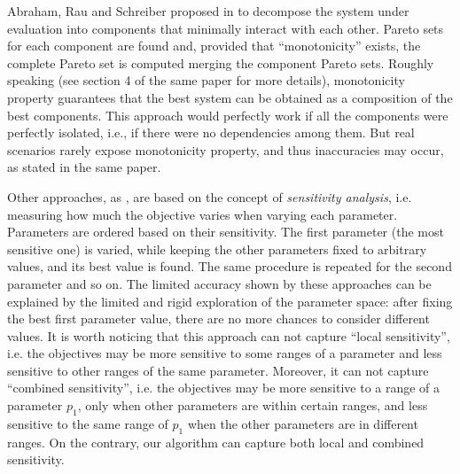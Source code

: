 Abraham, Rau and Schreiber proposed in \cite{santosh_hptr00} to
decompose the system under evaluation into components that minimally interact with each other. Pareto sets for each component are found
and, provided that ``monotonicity'' exists, the complete Pareto set is
computed merging the component Pareto sets. Roughly speaking (see
section 4 of the same paper for more details), monotonicity property
guarantees that the best system can be obtained as a composition of
the best components. This approach would perfectly work if all the
components were perfectly isolated, i.e., if there were no
dependencies among them. But real scenarios rarely expose monotonicity
property, and thus inaccuracies may occur, as stated in the same paper.

Other approaches, as \cite{fornaciari_codes01,palesi_iwsoc02}, are
based on the concept of \emph{sensitivity analysis}, i.e. measuring
how much the objective varies when varying each parameter.  Parameters
are ordered based on their sensitivity. The first parameter (the most
sensitive one) is varied, while keeping the other parameters fixed to
arbitrary values, and its best value is found. The same procedure is repeated for the second parameter and so on. The limited accuracy
shown by these approaches can be explained by the limited and rigid
exploration of the parameter space: after fixing the best first
parameter value, there are no more chances to consider different
values. It is worth noticing that this approach can not capture
``local sensitivity'', i.e. the objectives may be more sensitive to
some ranges of a parameter and less sensitive to other ranges of the
same parameter. Moreover, it can not capture ``combined sensitivity'',
i.e. the objectives may be more sensitive to a range of a parameter
$p_{1}$, only when other parameters are within certain ranges, and
less sensitive to the same range of $p_{1}$ when the other parameters
are in different ranges. On the contrary, our algorithm can capture
both local and combined sensitivity.

